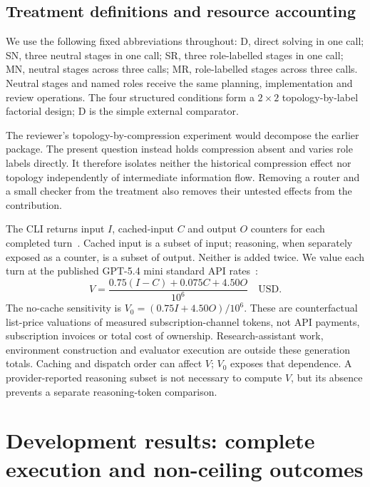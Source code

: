 \subsection{Treatment definitions and resource accounting}

We use the following fixed abbreviations throughout: D, direct solving in one call; SN, three neutral stages in one call; SR, three role-labelled stages in one call; MN, neutral stages across three calls; MR, role-labelled stages across three calls. Neutral stages and named roles receive the same planning, implementation and review operations. The four structured conditions form a $2\times2$ topology-by-label factorial design; D is the simple external comparator.

The reviewer's topology-by-compression experiment would decompose the earlier package. The present question instead holds compression absent and varies role labels directly. It therefore isolates neither the historical compression effect nor topology independently of intermediate information flow. Removing a router and a small checker from the treatment also removes their untested effects from the contribution.

The CLI returns input $I$, cached-input $C$ and output $O$ counters for each completed turn~\cite{codexexec2026}. Cached input is a subset of input; reasoning, when separately exposed as a counter, is a subset of output. Neither is added twice. We value each turn at the published GPT-5.4 mini standard API rates~\cite{openai54mini2026,openaipricing2026}:
\begin{equation}
V=\frac{0.75(I-C)+0.075C+4.50O}{10^6}\quad\mathrm{USD}.
\end{equation}
The no-cache sensitivity is $V_0=(0.75I+4.50O)/10^6$. These are counterfactual list-price valuations of measured subscription-channel tokens, not API payments, subscription invoices or total cost of ownership. Research-assistant work, environment construction and evaluator execution are outside these generation totals. Caching and dispatch order can affect $V$; $V_0$ exposes that dependence. A provider-reported reasoning subset is not necessary to compute $V$, but its absence prevents a separate reasoning-token comparison.

\section{Development results: complete execution and non-ceiling outcomes}
\label{sec:dev40-results}

